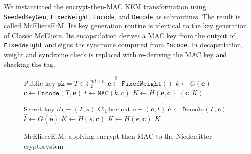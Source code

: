 \documentclass[runningheads]{llncs}
\newcommand{\encap}{\texttt{Encap}}
\newcommand{\decap}{\texttt{Decap}}
\newcommand{\mac}{\texttt{MAC}}
\newcommand{\pk}{\texttt{pk}}
\newcommand{\sk}{\texttt{sk}}
\newcommand{\leftsample}{\stackrel{\$}{\leftarrow}}
\begin{document}
We instantiated the encrypt-then-MAC KEM transformation using \\ \texttt{SeededKeyGen}, \texttt{FixedWeight}, \texttt{Encode}, and \texttt{Decode} as subroutines. The result is called McElieceEtM. Its key generation routine is identical to the key generation of Classic McEliece. Its encapsulation derives a MAC key from the output of \texttt{FixedWeight} and signs the syndrome computed from \texttt{Encode}. In decapsulation, weight and syndrome check is replaced with re-deriving the MAC key and checking the tag.

\begin{figure}[h]
    \centering
    
    \begin{minipage}[t]{0.48\textwidth}
        \begin{algorithm}[H]
            \caption{$\encap_\text{McElieceEtM}(\pk)$}
            \begin{algorithmic}[1]
                \Require Public key $\pk = T \in\mathbb{F}_2^{mt \times n}$
                \State $\mathbf{e} \leftsample \texttt{FixedWeight}()$
                \State $k \leftarrow G(\mathbf{e})$
                \State $\mathbf{c} \leftarrow \texttt{Encode}(T, \mathbf{e})$
                \State $t \leftarrow \mac(k, c)$
                \State $K \leftarrow H(\mathbf{e}, \mathbf{c})$
                \State \Return $(\mathbf{c}, K)$
            \end{algorithmic}
        \end{algorithm}
    \end{minipage}\hfill
    \begin{minipage}[t]{0.48\textwidth}
        \begin{algorithm}[H]
            \caption{$\decap_\text{McElieceEtM}(\sk, c)$}
            \begin{algorithmic}[1]
                \Require Secret key $\sk = (\Gamma, s)$
                \Require Ciphertext $c = (\mathbf{c}, t)$
                \State $\hat{\mathbf{e}} \leftarrow \texttt{Decode}(\Gamma, \mathbf{c})$
                \State $\hat{k} \leftarrow G(\hat{\mathbf{e}})$
                \If{$\mac(\hat{k}, \mathbf{c}) \neq t$}
                    \State $K \leftarrow H(s, \mathbf{c})$
                \Else
                    \State $K \leftarrow H(\mathbf{e}, \mathbf{c})$
                \EndIf
                \State\Return $K$
            \end{algorithmic}
        \end{algorithm}
    \end{minipage}

    \caption{McElieceEtM: applying encrypt-then-MAC to the Niedereitter cryptosystem}\label{fig:mceliece-plus}
\end{figure}
\end{document}
